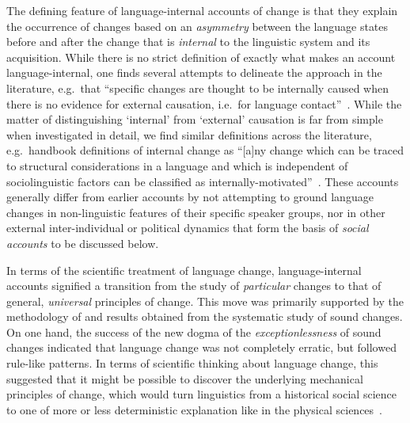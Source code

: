 The defining feature of language-internal accounts of change is that they explain the occurrence of changes based on an \emph{asymmetry} between the language states before and after the change that is \emph{internal} to the linguistic system and its acquisition. %
While there is no strict definition of exactly what makes an account language-internal, one finds several attempts to delineate the approach in the literature, e.g.~that ``specific changes are thought to be internally caused when there is no evidence for external causation, i.e.~for language contact''~\citep[p.366]{Luraghi2010}.
While the matter of distinguishing `internal' from `external' causation is far from simple when investigated in detail, we find similar definitions across the literature, e.g.~handbook definitions of internal change as ``[a]ny change which can be traced to structural considerations in a language and which is independent of sociolinguistic factors can be classified as internally-motivated''~\citep[p.388]{Hickey2012}.
These accounts generally differ from earlier accounts by not attempting to ground language changes in non-linguistic features of their specific speaker groups, nor in other external inter-individual or political dynamics that form the basis of \emph{social accounts} to be discussed below.

In terms of the scientific treatment of language change, language-internal accounts signified a transition from the study of \emph{particular} changes to that of general, \emph{universal} principles of change. This move was primarily supported by the methodology of and results obtained from the systematic study of sound changes. On one hand, the success of the new dogma of the \emph{exceptionlessness} of sound changes indicated that language change was not completely erratic, but followed rule-like patterns. In terms of scientific thinking about language change, this suggested that it might be possible to discover the underlying mechanical principles of change, which would turn linguistics from a historical social science to one of more or less deterministic explanation like in the physical sciences~\citep{Sapir1929}.

